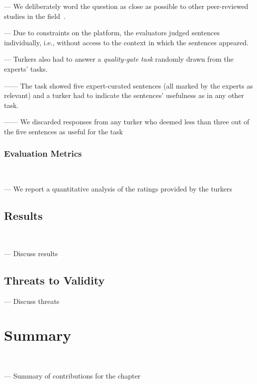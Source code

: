--- We deliberately word the question as close as possible to other peer-reviewed studies in the field~\cite{nadi2020, Xu2017}. \vspace{3mm}


--- Due to constraints on the platform, the evaluators judged sentences individually, i.e., without access to the context in which the sentences appeared. \vspace{3mm}

--- Turkers also had to answer a \textit{quality-gate task} randomly drawn from the experts' tasks.

------ The task showed five expert-curated sentences (all marked by the experts as relevant) and a turker had to indicate the sentences' usefulness as in any other task.

------ We discarded responses from any turker who deemed less than three out of the five sentences as useful for the task


\subsubsection{Evaluation Metrics}
\textcolor{white}{force ident} %

--- We report a quantitative analysis of the ratings provided by the turkers




\subsection{Results}
\textcolor{white}{force ident} %

--- Discuss results \vspace{3mm}

\subsection{Threats to Validity}

--- Discuss threats \vspace{3mm}

\clearpage

\section{Summary}
\textcolor{white}{force ident} %

--- Summary of contributions for the chapter \vspace{3mm}

